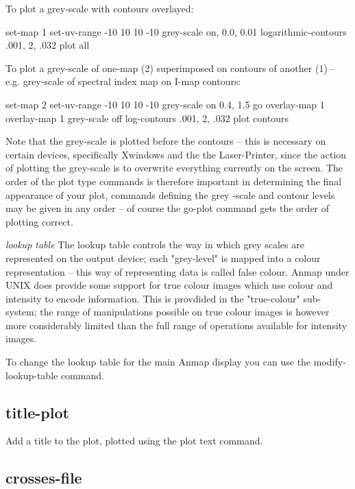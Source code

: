 To plot a grey-scale with contours overlayed:

      set-map 1
      set-uv-range -10 10 10 -10
      grey-scale on, 0.0, 0.01
      logarithmic-contours .001, 2, .032
      plot all

To plot a grey-scale of one-map (2) superimposed on contours
of another (1) -- e.g. grey-scale of spectral index map on
I-map contours:

      set-map 2
      set-uv-range -10 10 10 -10
      grey-scale on 0.4, 1.5
      go
      overlay-map 1
      overlay-map 1
      grey-scale off
      log-contours .001, 2, .032
      plot contours

Note that the grey-scale is plotted before the contours --
this is necessary on certain devices, specifically Xwindows and the
the Laser-Printer, since the action of plotting
the grey-scale is to overwrite everything currently on the
screen. The order of the plot type commands is therefore
important in determining the final appearance of your plot,
commands defining the grey -scale and contour levels may be
given in any order -- of course the go-plot command gets the
order of plotting correct.

{\large\em lookup table}
\newline
The lookup table controls the way in which grey scales are represented
on the output device; each "grey-level" is mapped into a colour
representation -- this way of representing data is called false colour.
Anmap under UNIX does provide some support for true colour images which
use colour and intensity to encode information.  This is provdided in the
"true-colour" sub-system; the range of manipulations possible on true
colour images is however more considerably limited than the full range
of operations available for intensity images.

To change the lookup table for the main Anmap display you can use the
modify-lookup-table command.

\subsection{title-plot}

Add a title to the plot, plotted using the plot text command.


\subsection{crosses-file}

